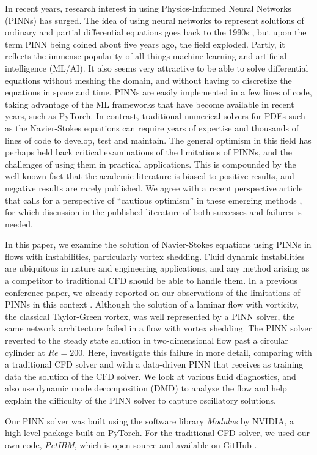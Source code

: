 
In recent years, research interest in using Physics-Informed Neural Networks (PINNs) has surged.
The idea of using neural networks to represent solutions of ordinary and partial differential equations goes back to the 1990s \cite{dissanayake_neural-network-based_1994,lagaris_artificial_1998}, but upon the term PINN being coined about five years ago, the field exploded. 
Partly, it reflects the immense popularity of all things machine learning and artificial intelligence (ML/AI). 
It also seems very attractive to be able to solve differential equations without meshing the domain, and without having to discretize the equations in space and time. 
PINNs are easily implemented in a few lines of code, taking advantage of the ML frameworks that have become available in recent years, such as PyTorch. 
In contrast, traditional numerical solvers for PDEs such as the Navier-Stokes equations can require years of expertise and thousands of lines of code to develop, test and maintain. 
The general optimism in this field has perhaps held back critical examinations of the limitations of PINNs, and the challenges of using them in practical applications. 
This is compounded by the well-known fact that the academic literature is biased to positive results, and negative results are rarely published. 
We agree with a recent perspective article that calls for a perspective of ``cautious optimism'' in these emerging methods \cite{vinuesa_emerging_2022}, for which discussion in the published literature of both successes and failures is needed.

In this paper, we examine the solution of Navier-Stokes equations using PINNs in flows with instabilities, particularly vortex shedding. 
Fluid dynamic instabilities are ubiquitous in nature and engineering applications, and any method arising as a competitor to traditional CFD should be able to handle them. 
In a previous conference paper, we already reported on our observations of the limitations of PINNs in this context \cite{chuang_experience_2022}. 
Although the solution of a laminar flow with vorticity, the classical Taylor-Green vortex, was well represented by a PINN solver, the same network architecture failed in a flow with vortex shedding. 
The PINN solver reverted to the steady state solution in two-dimensional flow past a circular cylinder at $Re=200$. 
Here, investigate this failure in more detail, comparing with a traditional CFD solver and with a data-driven PINN that receives as training data the solution of the CFD solver. 
We look at various fluid diagnostics, and also use dynamic mode decomposition (DMD) to analyze the flow and help explain the difficulty of the PINN solver to capture oscillatory solutions.

Our PINN solver was built using the software library \emph{Modulus} by NVIDIA, a high-level package built on PyTorch.
For the traditional CFD solver, we used our own code, \emph{PetIBM}, which is open-source and available on GitHub \cite{chuang_petibm_2018}.